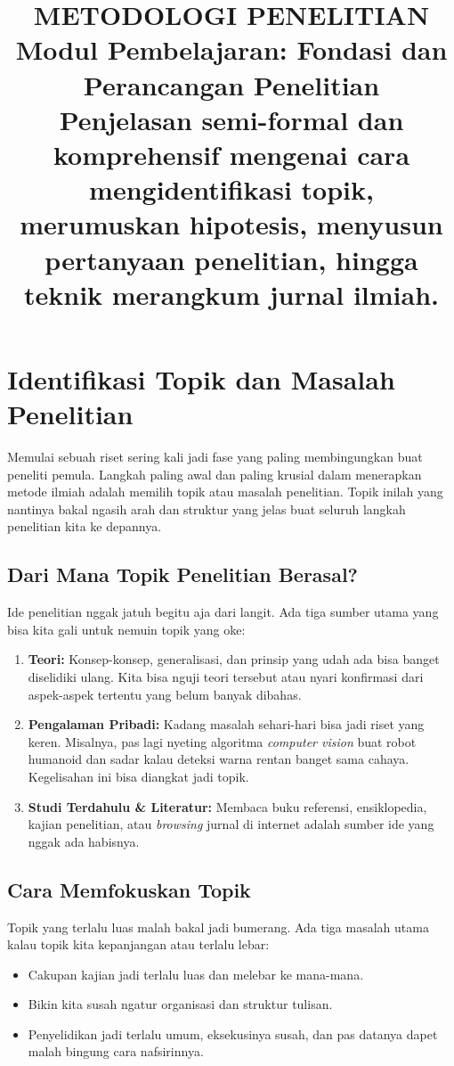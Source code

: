 \documentclass[12pt,a4paper]{article}
\title{
  {\LARGE\bfseries METODOLOGI PENELITIAN}\\[0.5em]
  {\large Modul Pembelajaran: Fondasi dan Perancangan Penelitian}\\[0.8em]
  {\normalsize Penjelasan semi-formal dan komprehensif mengenai cara mengidentifikasi topik, merumuskan hipotesis, menyusun pertanyaan penelitian, hingga teknik merangkum jurnal ilmiah.}
}
\author{}
\date{}
\begin{document}
\maketitle
\thispagestyle{fancy}
\tableofcontents
\newpage


\section{Identifikasi Topik dan Masalah Penelitian} 

Memulai sebuah riset sering kali jadi fase yang paling membingungkan buat peneliti pemula. Langkah paling awal dan paling krusial dalam menerapkan metode ilmiah adalah memilih topik atau masalah penelitian. Topik inilah yang nantinya bakal ngasih arah dan struktur yang jelas buat seluruh langkah penelitian kita ke depannya.

\subsection{Dari Mana Topik Penelitian Berasal?}
Ide penelitian nggak jatuh begitu aja dari langit. Ada tiga sumber utama yang bisa kita gali untuk nemuin topik yang oke:
\begin{enumerate}
    \item \textbf{Teori:} Konsep-konsep, generalisasi, dan prinsip yang udah ada bisa banget diselidiki ulang. Kita bisa nguji teori tersebut atau nyari konfirmasi dari aspek-aspek tertentu yang belum banyak dibahas.
    \item \textbf{Pengalaman Pribadi:} Kadang masalah sehari-hari bisa jadi riset yang keren. Misalnya, pas lagi nyeting algoritma \textit{computer vision} buat robot humanoid dan sadar kalau deteksi warna rentan banget sama cahaya. Kegelisahan ini bisa diangkat jadi topik.
    \item \textbf{Studi Terdahulu \& Literatur:} Membaca buku referensi, ensiklopedia, kajian penelitian, atau \textit{browsing} jurnal di internet adalah sumber ide yang nggak ada habisnya.
\end{enumerate}

\subsection{Cara Memfokuskan Topik}
Topik yang terlalu luas malah bakal jadi bumerang. Ada tiga masalah utama kalau topik kita kepanjangan atau terlalu lebar:
\begin{itemize}
    \item Cakupan kajian jadi terlalu luas dan melebar ke mana-mana.
    \item Bikin kita susah ngatur organisasi dan struktur tulisan.
    \item Penyelidikan jadi terlalu umum, eksekusinya susah, dan pas datanya dapet malah bingung cara nafsirinnya.
\end{itemize}
\end{document}
